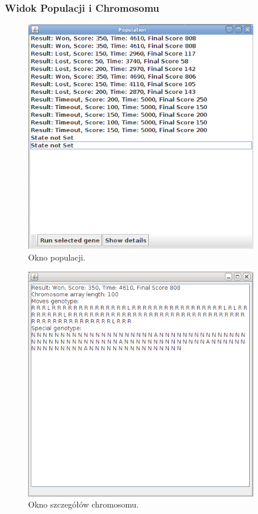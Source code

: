 \subsubsection{Widok Populacji i Chromosomu}
\begin{par}

	\begin{figure}[!h]
		\centering
		\includegraphics[width=4in]{obrazki/populacja.png}
		\caption{Okno populacji.}
		\label{fig:populacja}
	\end{figure}


	\begin{figure}[!h]
		\centering
		\includegraphics[width=4in]{obrazki/chromosom.png}
		\caption{Okno szczegółów chromosomu.}
		\label{fig:chromosom}
	\end{figure}
\end{par}




